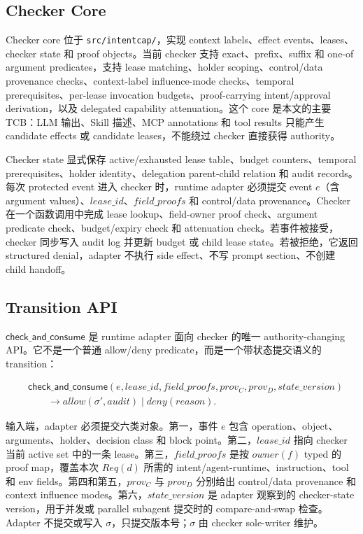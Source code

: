 \documentclass[UTF8,a4paper,11pt]{ctexart}
\begin{document}
\subsection{Checker Core}
Checker core 位于 \texttt{src/intentcap/}，实现 context labels、effect events、leases、checker state 和 proof objects。当前 checker 支持 exact、prefix、suffix 和 one-of argument predicates，支持 lease matching、holder scoping、control/data provenance checks、context-label influence-mode checks、temporal prerequisites、per-lease invocation budgets、proof-carrying intent/approval derivation，以及 delegated capability attenuation。这个 core 是本文的主要 TCB：LLM 输出、Skill 描述、MCP annotations 和 tool results 只能产生 candidate effects 或 candidate leases，不能绕过 checker 直接获得 authority。

Checker state 显式保存 active/exhausted lease table、budget counters、temporal prerequisites、holder identity、delegation parent-child relation 和 audit records。每次 protected event 进入 checker 时，runtime adapter 必须提交 event \(e\)（含 argument values）、\(lease\_id\)、\(field\_proofs\) 和 control/data provenance。Checker 在一个函数调用中完成 lease lookup、field-owner proof check、argument predicate check、budget/expiry check 和 attenuation check。若事件被接受，checker 同步写入 audit log 并更新 budget 或 child lease state。若被拒绝，它返回 structured denial，adapter 不执行 side effect、不写 prompt section、不创建 child handoff。

\subsection{Transition API}

\(\mathsf{check\_and\_consume}\) 是 runtime adapter 面向 checker 的唯一 authority-changing API。它不是一个普通 allow/deny predicate，而是一个带状态提交语义的 transition：

\[
\begin{aligned}
&\mathsf{check\_and\_consume}(e,lease\_id,field\_proofs,prov_C,prov_D,state\_version)\\
&\qquad \rightarrow allow(\sigma',audit)\mid deny(reason).
\end{aligned}
\]

输入端，adapter 必须提交六类对象。第一，事件 \(e\) 包含 operation、object、arguments、holder、decision class 和 block point。第二，\(lease\_id\) 指向 checker 当前 active set 中的一条 lease。第三，\(field\_proofs\) 是按 \(owner(f)\) typed 的 proof map，覆盖本次 \(Req(d)\) 所需的 intent/agent-runtime、instruction、tool 和 env fields。第四和第五，\(prov_C\) 与 \(prov_D\) 分别给出 control/data provenance 和 context influence modes。第六，\(state\_version\) 是 adapter 观察到的 checker-state version，用于并发或 parallel subagent 提交时的 compare-and-swap 检查。Adapter 不提交或写入 \(\sigma\)，只提交版本号；\(\sigma\) 由 checker sole-writer 维护。
\end{document}
